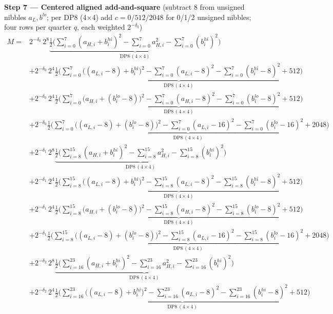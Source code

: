 \documentclass[fleqn]{article}
\newcommand{\DPop}[3]{\mathrm{DP#1}\,(#2\!\times\!#3)}
\begin{document}
\textbf{Step 7 --- Centered aligned add-and-square}\quad
{\small(subtract $8$ from unsigned nibbles $a_L,b^{lo}$; per DP8 (4$\times$4) add $c=0/512/2048$ for 0/1/2 unsigned nibbles; four rows per quarter $q$, each weighted $2^{-\delta_q}$)}
{\small
\begin{align*}
M = {}
  & 2^{-\delta_0}\,2^{8}\underbrace{\tfrac12\Big(\sum_{i=0}^{7}(a_{H,i}{+}b_i^{hi})^2 - \sum_{i=0}^{7}a_{H,i}^2 - \sum_{i=0}^{7}(b_i^{hi})^2\Big)}_{\DPop{8}{4}{4}} \\[0.15em]
  & + 2^{-\delta_0}\,2^{4}\underbrace{\tfrac12\Big(\sum_{i=0}^{7}\big((a_{L,i}{-}8){+}b_i^{hi}\big)^2 - \sum_{i=0}^{7}(a_{L,i}{-}8)^2 - \sum_{i=0}^{7}(b_i^{hi}{-}8)^2 + 512\Big)}_{\DPop{8}{4}{4}} \\[0.15em]
  & + 2^{-\delta_0}\,2^{4}\underbrace{\tfrac12\Big(\sum_{i=0}^{7}\big(a_{H,i}{+}(b_i^{lo}{-}8)\big)^2 - \sum_{i=0}^{7}(a_{H,i}{-}8)^2 - \sum_{i=0}^{7}(b_i^{lo}{-}8)^2 + 512\Big)}_{\DPop{8}{4}{4}} \\[0.15em]
  & + 2^{-\delta_0}\underbrace{\tfrac12\Big(\sum_{i=0}^{7}\big((a_{L,i}{-}8){+}(b_i^{lo}{-}8)\big)^2 - \sum_{i=0}^{7}(a_{L,i}{-}16)^2 - \sum_{i=0}^{7}(b_i^{lo}{-}16)^2 + 2048\Big)}_{\DPop{8}{4}{4}} \\[0.15em]
  & + 2^{-\delta_1}\,2^{8}\underbrace{\tfrac12\Big(\sum_{i=8}^{15}(a_{H,i}{+}b_i^{hi})^2 - \sum_{i=8}^{15}a_{H,i}^2 - \sum_{i=8}^{15}(b_i^{hi})^2\Big)}_{\DPop{8}{4}{4}} \\[0.15em]
  & + 2^{-\delta_1}\,2^{4}\underbrace{\tfrac12\Big(\sum_{i=8}^{15}\big((a_{L,i}{-}8){+}b_i^{hi}\big)^2 - \sum_{i=8}^{15}(a_{L,i}{-}8)^2 - \sum_{i=8}^{15}(b_i^{hi}{-}8)^2 + 512\Big)}_{\DPop{8}{4}{4}} \\[0.15em]
  & + 2^{-\delta_1}\,2^{4}\underbrace{\tfrac12\Big(\sum_{i=8}^{15}\big(a_{H,i}{+}(b_i^{lo}{-}8)\big)^2 - \sum_{i=8}^{15}(a_{H,i}{-}8)^2 - \sum_{i=8}^{15}(b_i^{lo}{-}8)^2 + 512\Big)}_{\DPop{8}{4}{4}} \\[0.15em]
  & + 2^{-\delta_1}\underbrace{\tfrac12\Big(\sum_{i=8}^{15}\big((a_{L,i}{-}8){+}(b_i^{lo}{-}8)\big)^2 - \sum_{i=8}^{15}(a_{L,i}{-}16)^2 - \sum_{i=8}^{15}(b_i^{lo}{-}16)^2 + 2048\Big)}_{\DPop{8}{4}{4}} \\[0.15em]
  & + 2^{-\delta_2}\,2^{8}\underbrace{\tfrac12\Big(\sum_{i=16}^{23}(a_{H,i}{+}b_i^{hi})^2 - \sum_{i=16}^{23}a_{H,i}^2 - \sum_{i=16}^{23}(b_i^{hi})^2\Big)}_{\DPop{8}{4}{4}} \\[0.15em]
  & + 2^{-\delta_2}\,2^{4}\underbrace{\tfrac12\Big(\sum_{i=16}^{23}\big((a_{L,i}{-}8){+}b_i^{hi}\big)^2 - \sum_{i=16}^{23}(a_{L,i}{-}8)^2 - \sum_{i=16}^{23}(b_i^{hi}{-}8)^2 + 512\Big)}_{\DPop{8}{4}{4}} \\[0.15em]

\end{align*}}
\end{document}
